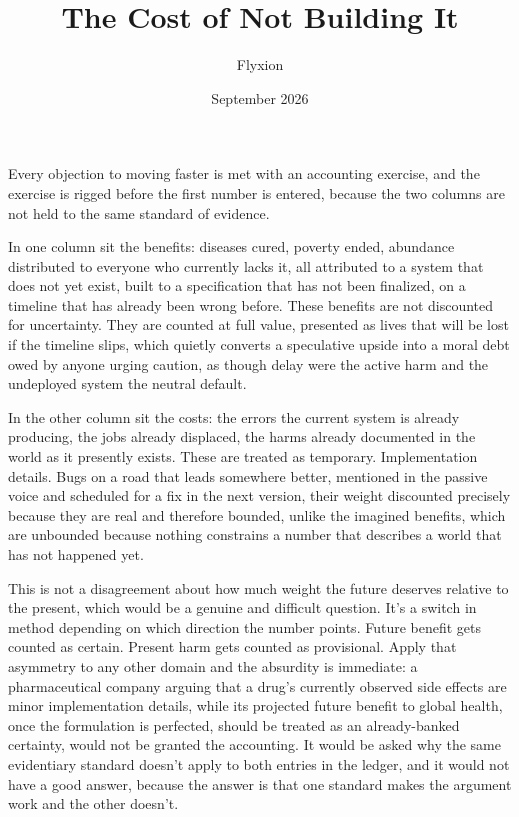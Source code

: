 \documentclass[11pt]{article}
\title{The Cost of Not Building It}
\author{Flyxion}
\date{September 2026}
\begin{document}
\maketitle

Every objection to moving faster is met with an accounting exercise, and the exercise is rigged before the first number is entered, because the two columns are not held to the same standard of evidence.

In one column sit the benefits: diseases cured, poverty ended, abundance distributed to everyone who currently lacks it, all attributed to a system that does not yet exist, built to a specification that has not been finalized, on a timeline that has already been wrong before. These benefits are not discounted for uncertainty. They are counted at full value, presented as lives that will be lost if the timeline slips, which quietly converts a speculative upside into a moral debt owed by anyone urging caution, as though delay were the active harm and the undeployed system the neutral default.

In the other column sit the costs: the errors the current system is already producing, the jobs already displaced, the harms already documented in the world as it presently exists. These are treated as temporary. Implementation details. Bugs on a road that leads somewhere better, mentioned in the passive voice and scheduled for a fix in the next version, their weight discounted precisely because they are real and therefore bounded, unlike the imagined benefits, which are unbounded because nothing constrains a number that describes a world that has not happened yet.

This is not a disagreement about how much weight the future deserves relative to the present, which would be a genuine and difficult question. It's a switch in method depending on which direction the number points. Future benefit gets counted as certain. Present harm gets counted as provisional. Apply that asymmetry to any other domain and the absurdity is immediate: a pharmaceutical company arguing that a drug's currently observed side effects are minor implementation details, while its projected future benefit to global health, once the formulation is perfected, should be treated as an already-banked certainty, would not be granted the accounting. It would be asked why the same evidentiary standard doesn't apply to both entries in the ledger, and it would not have a good answer, because the answer is that one standard makes the argument work and the other doesn't.
\end{document}
